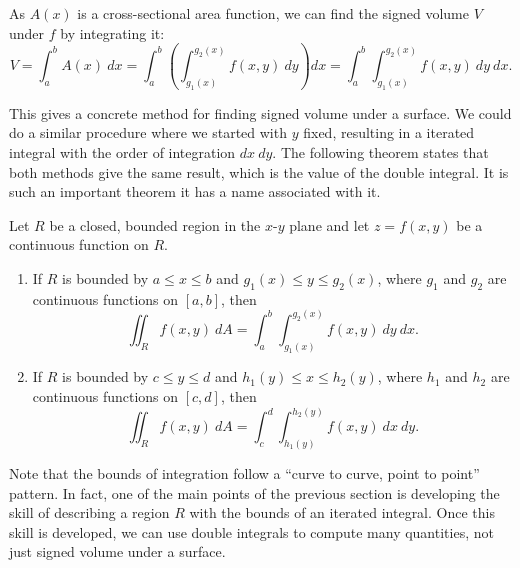 As $A(x)$ is a cross-sectional area function, we can find the signed volume $V$ under $f$ by integrating it:
\[
V = \int_a^b A(x)\ dx = \int_a^b\left(\int_{g_1(x)}^{g_2(x)} f(x,y)\ dy\right)dx
= \int_a^b\int_{g_1(x)}^{g_2(x)} f(x,y)\ dy\ dx.
\]

This gives a concrete method for finding signed volume under a surface. We could do a similar procedure where we started with $y$ fixed, resulting in a iterated integral with the order of integration $dx\ dy$. The following theorem states that both methods give the same result, which is the value of the double integral. It is such an important theorem it has a name associated with it.

{Let $R$ be a closed, bounded region in the $x$-$y$ plane and let $z=f(x,y)$ be a continuous function on $R$.%
\begin{enumerate}
	\item If $R$ is bounded by $a\leq x\leq b$ and $g_1(x)\leq y\leq g_2(x)$, where $g_1$ and $g_2$ are continuous functions on $[a,b]$, then
	\[\iint_R f(x,y)\ dA = \int_a^b\int_{g_1(x)}^{g_2(x)} f(x,y)\ dy\ dx.\]
	
	\item If $R$ is bounded by $c\leq y\leq d$ and $h_1(y)\leq x\leq h_2(y)$, where $h_1$ and $h_2$ are continuous functions on $[c,d]$, then
	\[\iint_R f(x,y)\ dA = \int_c^d\int_{h_1(y)}^{h_2(y)} f(x,y)\ dx\ dy.\]
\end{enumerate}}

Note that the bounds of integration follow a ``curve to curve, point to point'' pattern. In fact, one of the main points of the previous section is developing the skill of describing a region $R$ with the bounds of an iterated integral. Once this skill is developed, we can use double integrals to compute many quantities, not just signed volume under a surface.



